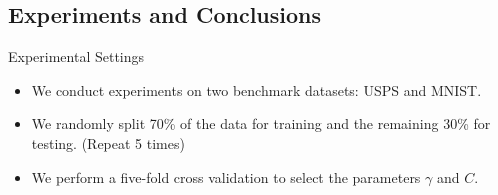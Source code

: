 \documentclass{beamer}
\begin{document}
\subsection{Experiments and Conclusions}
\begin{frame}{Experimental Settings}
\begin{itemize}
  \item We conduct experiments on two benchmark datasets: USPS and MNIST.
  \item We randomly split 70\% of the data for training and the remaining 30\% for testing. (Repeat 5 times)
  \item We perform a five-fold cross validation to select the parameters $\gamma$ and $C$.
\end{itemize}
\begin{table}
\caption{Dataset descriptions (with the number $\ell$ of instances and the dimension $d$ of the data). The sizes for storing the data $\ell d$ and the associated kernel matrices $\ell^2$ are also listed.}
\label{tab:datasets}
\end{table}
\end{frame}
\end{document}
